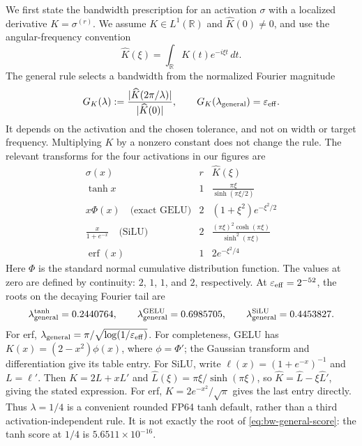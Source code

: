 \documentclass[11pt]{article}
\begin{document}
We first state the bandwidth prescription for an activation $\sigma$ with a
localized derivative $K=\sigma^{(r)}$. We assume $K\in L^1(\mathbb R)$ and
$\widehat K(0)\ne0$, and use the angular-frequency convention
\[
 \widehat K(\xi)=\int_{\mathbb R}K(t)e^{-i\xi t}\,dt.
\]
The general rule selects a bandwidth from the normalized Fourier magnitude
\begin{equation}
 G_K(\lambda):=
 \frac{|\widehat K(2\pi/\lambda)|}{|\widehat K(0)|},
 \qquad
 G_K(\lambda_{\rm general})=\varepsilon_{\rm eff}.
 \label{eq:bw-general-score}
\end{equation}
It depends on the activation and the chosen tolerance, and not on width or
target frequency. Multiplying $K$ by a nonzero constant does not change the
rule. The relevant transforms for the four activations in our figures are
\begin{equation}
\begin{array}{c|c|c}
 \sigma(x)&r&\widehat K(\xi)\\\hline
 \tanh x&1&\displaystyle\frac{\pi\xi}{\sinh(\pi\xi/2)}\\[5pt]
 x\Phi(x)\quad\text{(exact GELU)}&2&
       (1+\xi^2)e^{-\xi^2/2}\\[3pt]
 \displaystyle\frac{x}{1+e^{-x}}\quad\text{(SiLU)}&2&
       \displaystyle\frac{(\pi\xi)^2\cosh(\pi\xi)}{\sinh^2(\pi\xi)}\\[5pt]
 \operatorname{erf}(x)&1&2e^{-\xi^2/4}
\end{array}
\label{eq:bw-three-transforms}
\end{equation}
Here $\Phi$ is the standard normal cumulative distribution function. The
values at zero are defined by continuity: $2$, $1$, $1$, and $2$, respectively.
At $\varepsilon_{\rm eff}=2^{-52}$, the roots on the decaying Fourier tail are
\[
 \lambda_{\rm general}^{\tanh}=0.2440764,\qquad
 \lambda_{\rm general}^{\rm GELU}=0.6985705,\qquad
 \lambda_{\rm general}^{\rm SiLU}=0.4453827.
\]
For erf, $\lambda_{\rm general}=\pi/\sqrt{\log(1/\varepsilon_{\rm eff})}$.
For completeness, GELU has $K(x)=(2-x^2)\phi(x)$, where $\phi=\Phi'$;
the Gaussian transform and differentiation give its table entry. For SiLU,
write $\ell(x)=(1+e^{-x})^{-1}$ and $L=\ell'$. Then
$K=2L+xL'$ and $\widehat L(\xi)=\pi\xi/\sinh(\pi\xi)$, so
$\widehat K=\widehat L-\xi\widehat L'$, giving the stated expression.
For erf, $K=2e^{-x^2}/\sqrt\pi$ gives the last entry directly.
Thus $\lambda=1/4$ is a convenient rounded FP64 tanh default, rather than a
third activation-independent rule. It is not exactly the root of
\eqref{eq:bw-general-score}: the tanh score at $1/4$ is
$5.6511\times10^{-16}$.
\end{document}
